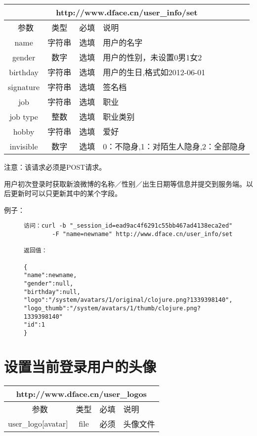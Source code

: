 \documentclass[cs4size]{ctexartutf8}
\begin{document}
\begin{table}[H]
   \begin{center}
\begin{tabular}{|c|c|c|p{12cm}|}
\hline
\multicolumn{4}{|c|}{http://www.dface.cn/user\_info/set} \\
\hline\hline
 \  参数  & 类型 & 必填 &  说明  \\
\hline
 name  & 字符串 & 选填 &  用户的名字\\
\hline
 gender  & 数字 & 选填 &  用户的性别，未设置0男1女2\\
\hline
 birthday  & 字符串 & 选填 &  用户的生日,格式如2012-06-01\\
 \hline
 signature  & 字符串 & 选填 &  签名档\\
 \hline
 job  & 字符串 & 选填 &  职业\\
 \hline
 job type  & 整数 & 选填 &  职业类别\\
 \hline
 hobby  & 字符串 & 选填 &  爱好\\
 \hline
 invisible  & 数字 & 选填 &  0：不隐身,1：对陌生人隐身,2：全部隐身\\
\hline
\end{tabular}
   \end{center}
\end{table}

注意：该请求必须是POST请求。

用户初次登录时获取新浪微博的名称／性别／出生日期等信息并提交到服务端。以后更新时可以只更新其中的某个字段。

例子：

\begin{figure}[H]
\begin{verbatim}
访问：curl -b "_session_id=ead9ac4f6291c55bb467ad4138eca2ed" 
        -F "name=newname" http://www.dface.cn/user_info/set

返回值：

{
"name":newname,
"gender":null,
"birthday":null,
"logo":"/system/avatars/1/original/clojure.png?1339398140",
"logo_thumb":"/system/avatars/1/thumb/clojure.png?1339398140"
"id":1
}

\end{verbatim}
\end{figure}


\section{设置当前登录用户的头像}

\begin{table}[H]
   \begin{center}
\begin{tabular}{|c|c|c|p{12cm}|}
\hline
\multicolumn{4}{|c|}{http://www.dface.cn/user\_logos} \\
\hline\hline
 \  参数  & 类型 & 必填 &  说明  \\
\hline
 user\_logo[avatar]  & file & 必须 &  头像文件\\
\hline
\end{tabular}
   \end{center}
\end{table}
\end{document}
